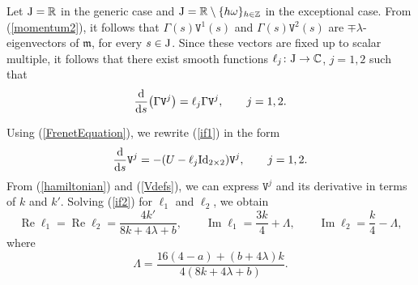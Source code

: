 \documentclass[10pt,a4paper]{amsart}
\newcommand\kk{k} %
\def\R{\mathbb R}
\def\Z{\mathbb Z}
\newcommand\tV{\mathtt{V}}
\renewcommand\Re{\operatorname{Re}}
\renewcommand\Im{\operatorname{Im}}
\numberwithin{equation}{section}
\begin{document}
Let ${\rm J}=\R$ in the generic case and ${\rm J}=\R\setminus \{h\omega\}_{h\in \Z}$ in the exceptional case. From (\ref{momentum2}), it follows that $\Gamma(s) {\mathtt V}^1(s)$ and $\Gamma(s) {\mathtt V}^2(s)$ are $\mp \lambda$-eigenvectors of ${\mathfrak m}$, for every $s\in {\rm J}$.
Since these vectors are fixed up to scalar multiple,
it follows that there exist smooth functions
$\ell_j\colon {\rm J}\to {\mathbb C}$, $j=1,2$ such that
\begin{equation}\label{if1}\frac{{\rm d}}{{\rm d}s}\bigl(\Gamma {\mathtt V}^j\bigr) =\ell_j \Gamma {\mathtt V}^j,\qquad j=1,2.
\end{equation}

Using (\ref{FrenetEquation}), we rewrite ({\ref{if1}) in the form
\begin{equation}\label{if2}
\frac{{\rm d}}{{\rm d}s}\tV^j
=-(U-\ell_j{\rm Id}_{2\times 2}){\mathtt V}^j,\qquad j = 1,2.
\end{equation}
From (\ref{hamiltonian}) and (\ref{Vdefs}), we can express ${\mathtt V}^j$ and its derivative in terms of $\kk$ and $\kk'$. Solving (\ref{if2}}) for $\ell_{1}$ and $\ell_{2}$, we obtain
\[
\Re \ell_1=\Re \ell_2=\frac{4\kk'}{8\kk+4\lambda+b}, \qquad
\Im \ell_1=\frac{3\kk}{4}+\Lambda,\qquad
\Im \ell_2=\frac{\kk}{4}-\Lambda,
\]
where
\begin{equation}\label{Lambda}
\Lambda = \frac{16(4-a)+(b+4\lambda)\kk}{4(8\kk+4\lambda+b)}.
\end{equation}
\end{document}
